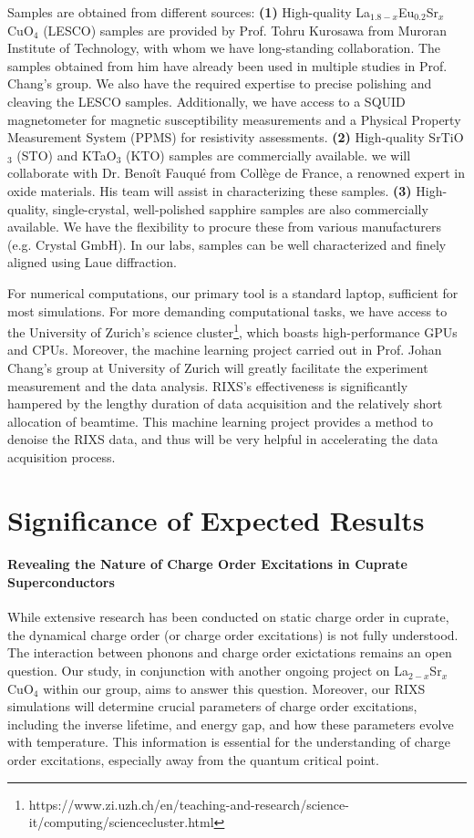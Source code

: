 \documentclass[11pt]{article}
\begin{document}
Samples are obtained from different sources: \textbf{(1)} High-quality {La$_{1.8-x}$Eu$_{0.2}$Sr$_x$CuO$_{4}$} (LESCO) samples are provided by Prof. Tohru Kurosawa from Muroran Institute of Technology, with whom we have long-standing collaboration. The samples obtained from him have already been used in multiple studies\cite{choi2022unveiling,wang_charge_2021} in Prof. Chang's group.
We also have the required expertise to precise polishing and cleaving the LESCO samples. Additionally, we have access to a SQUID magnetometer for magnetic susceptibility measurements and a Physical Property Measurement System (PPMS) for resistivity assessments.
\textbf{(2)} High-quality SrTiO$_{3}$ (STO) and KTaO$_{3}$ (KTO) samples are commercially available. we will collaborate with Dr. Benoît Fauqué from Collège de France, a renowned expert in oxide materials. His team will assist in characterizing these samples.
\textbf{(3)} High-quality, single-crystal, well-polished sapphire samples are also commercially available. We have the flexibility to procure these from various manufacturers (e.g. Crystal GmbH).
In our labs, samples can be well characterized and finely aligned using Laue diffraction.

For numerical computations, our primary tool is a standard laptop, sufficient for most simulations. For more demanding computational tasks, we have access to the University of Zurich's science cluster\footnote{https://www.zi.uzh.ch/en/teaching-and-research/science-it/computing/sciencecluster.html}, which boasts high-performance GPUs and CPUs. Moreover, the machine learning project carried out in Prof. Johan Chang's group at University of Zurich will greatly facilitate the experiment measurement and the data analysis. RIXS's  effectiveness is significantly hampered by the lengthy duration of data acquisition and the relatively short allocation of beamtime. This machine learning project provides a method to denoise the RIXS data, and thus will be very helpful in accelerating the data acquisition process.  


\section{Significance of Expected Results}
\paragraph{Revealing the Nature of Charge Order Excitations in Cuprate Superconductors} While extensive research has been conducted on static charge order in cuprate, the dynamical charge order (or charge order excitations) is not fully understood. The interaction between phonons and charge order exictations remains an open question. Our study, in conjunction with another ongoing project on La$_{2-x}$Sr$_x$CuO$_4$ within our group, aims to answer this question. Moreover, our RIXS simulations will determine crucial parameters of charge order excitations, including the inverse lifetime, and energy gap, and how these parameters evolve with temperature. This information is essential for the understanding of charge order excitations, especially away from the quantum critical point. 
\end{document}
